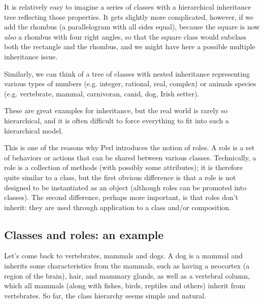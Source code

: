 It is relatively easy to imagine a series of classes with a 
hierarchical inheritance tree reflecting those properties. It 
gets slightly more complicated, however, if we add the rhombus 
(a parallelogram with all sides equal), because the square is 
now \emph{also} a rhombus with four right angles, so that 
the square class would subclass both the rectangle and the 
rhombus, and we might have here a possible multiple inheritance 
issue.

   
  
 
Similarly, we can think of a tree of classes with nested 
inheritance representing various types of numbers (e.g. integer, 
rational, real, complex) or animals species (e.g. vertebrate, 
mammal, carnivoran, canid, dog, Irish setter).

These are great examples for inheritance, but the real world is 
rarely so hierarchical, and it is often difficult to force 
everything to fit into such a hierarchical model.

This is one of the reasons why Perl introduces the notion of 
roles. A role is a set of behaviors or actions that can be shared 
between various classes. Technically, a role is a collection 
of methods (with possibly some attributes); it is therefore 
quite similar to a class, but the first obvious difference 
is that a role is not designed to be instantiated as an object 
(although roles can be promoted into classes). The 
second difference, perhaps more important, is that roles 
don't inherit: they are used through application to a class 
and/or composition.

\subsection{Classes and roles: an example}

  
Let's come back to vertebrates, mammals and dogs. A dog is 
a mammal and inherits some characteristics from the mammals, 
such as having a neocortex (a region of the brain), hair, 
and mammary glands, as well as a vertebral column, which 
all mammals (along with fishes, birds, reptiles and others) 
inherit from vertebrates. So far, the class hierarchy seems 
simple and natural.

